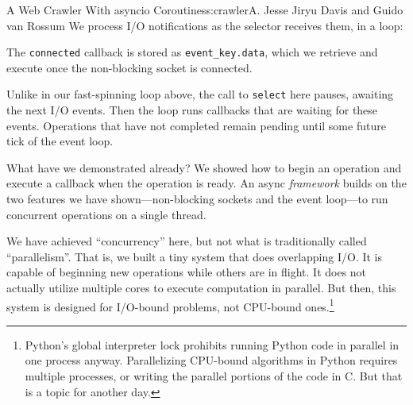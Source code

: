 \begin{aosachapter}{A Web Crawler With asyncio Coroutines}{s:crawler}{A. Jesse Jiryu Davis and Guido van Rossum}
We process I/O notifications as the selector receives them, in a loop:

\begin{Shaded}
\begin{Highlighting}[]
 
     \NormalTok{:}
         
\end{Highlighting}
\end{Shaded}

The \texttt{connected} callback is stored as \texttt{event\_key.data},
which we retrieve and execute once the non-blocking socket is connected.

Unlike in our fast-spinning loop above, the call to \texttt{select} here
pauses, awaiting the next I/O events. Then the loop runs callbacks that
are waiting for these events. Operations that have not completed remain
pending until some future tick of the event loop.

What have we demonstrated already? We showed how to begin an operation
and execute a callback when the operation is ready. An async
\emph{framework} builds on the two features we have shown---non-blocking
sockets and the event loop---to run concurrent operations on a single
thread.

We have achieved ``concurrency'' here, but not what is traditionally
called ``parallelism''. That is, we built a tiny system that does
overlapping I/O. It is capable of beginning new operations while others
are in flight. It does not actually utilize multiple cores to execute
computation in parallel. But then, this system is designed for I/O-bound
problems, not CPU-bound ones.\footnote{Python's global interpreter lock
  prohibits running Python code in parallel in one process anyway.
  Parallelizing CPU-bound algorithms in Python requires multiple
  processes, or writing the parallel portions of the code in C. But that
  is a topic for another day.}


\end{aosachapter}
